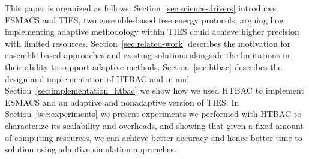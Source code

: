 This paper is organized as follows: Section~\ref{sec:science-drivers}
introduces ESMACS and TIES, two ensemble-based free energy protocols, arguing
how implementing adaptive methodology within TIES could achieve higher
precision with limited resources. Section~\ref{sec:related-work} describes
the motivation for ensemble-based approaches and existing solutions alongside
the limitations in their ability to support adaptive methods.
Section~\ref{sec:htbac} describes the design and implementation of HTBAC and
in and Section~\ref{sec:implementation_htbac} we show how we used HTBAC to
implement ESMACS and an adaptive and nonadaptive version of TIES. In
Section~\ref{sec:experiments} we present experiments we performed with HTBAC
to characterize its scalability and overheads, and showing that given a fixed
amount of computing resources, we can achieve better accuracy and hence
better time to solution using adaptive simulation approaches.